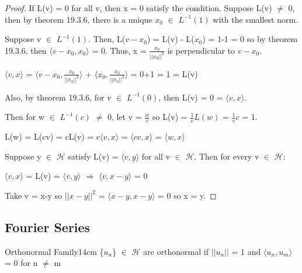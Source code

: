     \begin{proof}
        If L(v) = 0 for all v, then x = 0 satisfy the condition.
        Suppose L(v) $\not =$ 0, then by {\color{red} theorem 19.3.6},
        there is a unique $x_0$ $\in$ $L^{-1}(1)$ with the smallest norm.

        Suppose v $\in$ $L^{-1}(1)$.
        Then, L($v - x_0$) = L(v) - L($x_0$) = 1-1 = 0
        so by {\color{red} theorem 19.3.6},
        then $\langle v - x_0, x_0 \rangle$ = 0.
        Thus, x = $\frac{x_0}{||x_0||^2}$ is perpendicular to $v-x_0$.

        \hspace{0.5cm}
        $\langle v , x \rangle$
        = $\langle v-x_0 , \frac{x_0}{||x_0||^2} \rangle$
            + $\langle x_0 , \frac{x_0}{||x_0||^2} \rangle$
        = 0+1 = 1 = L(v)

        Also, by {\color{red} theorem 19.3.6}, for v $\in$ $L^{-1}(0)$,
        then L(v) = 0 = $\langle v , x \rangle$.

        Then for w $\in$ $L^{-1}(c)$ $\not =$ 0, let v = $\frac{w}{c}$
        so L(v) = $\frac{1}{c} L(w)$ = $\frac{1}{c} c$ = 1.

        \hspace{0.5cm}
        L(w) = L(cv) = cL(v) = c$\langle v , x \rangle$
        = $\langle cv , x \rangle$ = $\langle w , x \rangle$

        Suppose y $\in$ $\mathcal{H}$ satisfy L(v) = $\langle v , y \rangle$
        for all v $\in$ $\mathcal{H}$.
        Then for every v $\in$ $\mathcal{H}$:

        \hspace{0.5cm}
        $\langle v , x \rangle$
        = L(v) = $\langle v , y \rangle$
        \hspace{1cm}
        $\Rightarrow$
        \hspace{1cm}
        $\langle v , x-y \rangle$ = 0

        Take v = x-y so $||x-y||^2$ = $\langle x-y , x-y \rangle$ = 0
        so x = y.
    \end{proof}

    \newpage





\subsection{ Fourier Series }

    \begin{definition}{Orthonormal Family}{14cm}
        \{$u_n$\} $\in$ $\mathcal{H}$ are {\color{lblue} orthonormal}
        if $||u_n||$ = 1 and $\langle u_n , u_m \rangle$ = 0 for n $\not =$ m
    \end{definition}

